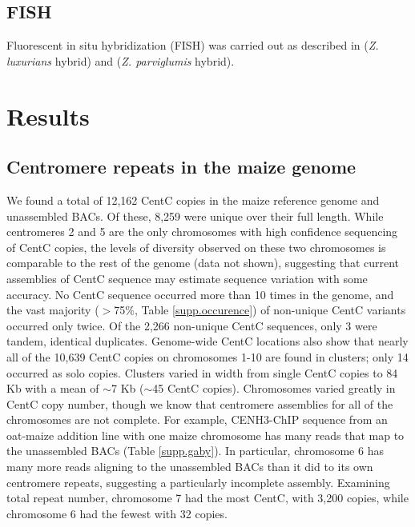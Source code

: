\subsection*{FISH}

Fluorescent in situ hybridization (FISH) was carried out as described in \citet{kato2004paint} (\emph{Z. luxurians} hybrid) and \citet{Shi2010} (\emph{Z. parviglumis} hybrid). 

\section*{Results}
\label{results}

\subsection*{Centromere repeats in the maize genome}

We found a total of 12,162 CentC copies in the maize reference genome and unassembled BACs.  
Of these, 8,259 were unique over their full length.
While centromeres 2 and 5 are the only chromosomes with high confidence sequencing of CentC copies, the levels of diversity observed on these two chromosomes is comparable to the rest of the genome (data not shown), suggesting that current assemblies of CentC sequence may estimate sequence variation with some accuracy.
No CentC sequence occurred more than 10 times in the genome, and the vast majority ($>$75\%, Table \ref{supp.occurence}) of non-unique CentC variants occurred only twice.  
Of the 2,266 non-unique CentC sequences, only 3 were tandem, identical duplicates.  
Genome-wide CentC locations also show that nearly all of the 10,639 CentC copies on chromosomes 1-10 are found in clusters; only 14 occurred as solo copies.  
Clusters varied in width from single CentC copies to 84 Kb with a mean of $\sim$7 Kb ($\sim$45 CentC copies). 
Chromosomes varied greatly in CentC copy number, though we know that centromere assemblies for all of the chromosomes are not complete.   
For example, CENH3-ChIP sequence from an oat-maize addition line with one maize chromosome \citep{kynast2001} has many reads that map to the unassembled BACs (Table \ref{supp.gaby}).  
In particular, chromosome 6 has many more reads aligning to the unassembled BACs than it did to its own centromere repeats, suggesting a particularly incomplete assembly.  
Examining total repeat number, chromosome 7 had the most CentC, with 3,200 copies, while chromosome 6 had the fewest with 32 copies.


